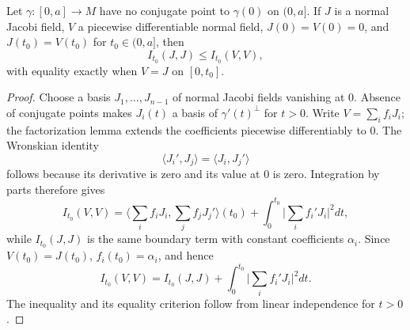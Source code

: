 \begin{lemma}
  \label{lem:dc-ch10-2-2}
  Let $\gamma:[0,a]\to M$ have no conjugate point to $\gamma(0)$ on $(0,a]$.
  If $J$ is a normal Jacobi field, $V$ a piecewise differentiable normal field,
  $J(0)=V(0)=0$, and $J(t_0)=V(t_0)$ for $t_0\in(0,a]$, then
  \[
  I_{t_0}(J,J)\leq I_{t_0}(V,V),
  \]
  with equality exactly when $V=J$ on $[0,t_0]$.
\end{lemma}
\begin{proof}
  \sketch
  Choose a basis $J_1,\ldots,J_{n-1}$ of normal Jacobi fields vanishing at $0$.
  Absence of conjugate points makes $J_i(t)$ a basis of $\gamma'(t)^\perp$ for
  $t>0$. Write $V=\sum_i f_iJ_i$; the factorization lemma extends the coefficients
  piecewise differentiably to $0$. The Wronskian identity
  \[
  \langle J_i',J_j\rangle=\langle J_i,J_j'\rangle
  \]
  follows because its derivative is zero and its value at $0$ is zero. Integration
  by parts therefore gives
  \[
  I_{t_0}(V,V)=\Big\langle\sum_i f_iJ_i,\sum_j f_jJ_j'\Big\rangle(t_0)
  +\int_0^{t_0}\Big|\sum_i f_i'J_i\Big|^2dt,
  \]
  while $I_{t_0}(J,J)$ is the same boundary term with constant coefficients
  $\alpha_i$. Since $V(t_0)=J(t_0)$, $f_i(t_0)=\alpha_i$, and hence
  \[
  I_{t_0}(V,V)=I_{t_0}(J,J)+\int_0^{t_0}\Big|\sum_i f_i'J_i\Big|^2dt.
  \]
  The inequality and its equality criterion follow from linear independence for
  $t>0$.
\end{proof}

